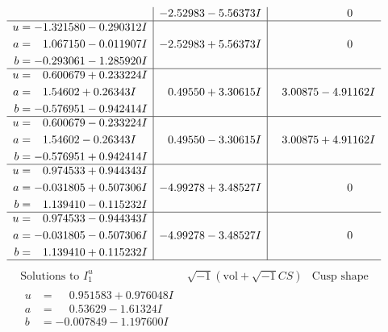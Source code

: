 \documentclass[1p]{elsarticle_modified}
\theoremstyle{definition}
\newcommand{\I}{\sqrt{-1}}
\begin{document}
$$\begin{array}{c|c|c}
 & -2.52983 - 5.56373 I & \phantom{-0.000000 } 0 \\ \hline\begin{aligned}
u &= -1.321580 - 0.290312 I \\
a &= \phantom{-}1.067150 - 0.011907 I \\
b &= -0.293061 - 1.285920 I\end{aligned}
 & -2.52983 + 5.56373 I & \phantom{-0.000000 } 0 \\ \hline\begin{aligned}
u &= \phantom{-}0.600679 + 0.233224 I \\
a &= \phantom{-}1.54602 + 0.26343 I \\
b &= -0.576951 - 0.942414 I\end{aligned}
 & \phantom{-}0.49550 + 3.30615 I & \phantom{-}3.00875 - 4.91162 I \\ \hline\begin{aligned}
u &= \phantom{-}0.600679 - 0.233224 I \\
a &= \phantom{-}1.54602 - 0.26343 I \\
b &= -0.576951 + 0.942414 I\end{aligned}
 & \phantom{-}0.49550 - 3.30615 I & \phantom{-}3.00875 + 4.91162 I \\ \hline\begin{aligned}
u &= \phantom{-}0.974533 + 0.944343 I \\
a &= -0.031805 + 0.507306 I \\
b &= \phantom{-}1.139410 - 0.115232 I\end{aligned}
 & -4.99278 + 3.48527 I & \phantom{-0.000000 } 0 \\ \hline\begin{aligned}
u &= \phantom{-}0.974533 - 0.944343 I \\
a &= -0.031805 - 0.507306 I \\
b &= \phantom{-}1.139410 + 0.115232 I\end{aligned}
 & -4.99278 - 3.48527 I & \phantom{-0.000000 } 0\\
 \hline 
 \end{array}$$\newpage$$\begin{array}{c|c|c}  
\text{Solutions to }I^u_{1}& \I (\text{vol} + \sqrt{-1}CS) & \text{Cusp shape}\\
 \hline 
\begin{aligned}
u &= \phantom{-}0.951583 + 0.976048 I \\
a &= \phantom{-}0.53629 - 1.61324 I \\
b &= -0.007849 - 1.197600 I\end{aligned}

\end{array}$$
\end{document}
